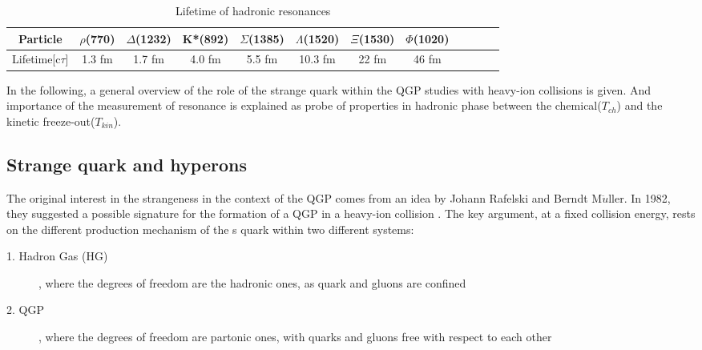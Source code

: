 \begin{table}[h!]
\begin{center}

\begin{tabular}{|c|c|c|c|c|c|c|clc|c|c|}
\hline
Particle & $\rho$(770) & $\Delta$(1232) &K*(892) & $\Sigma$(1385) &$\Lambda$(1520) & $\Xi$(1530)& $\Phi$(1020)\\
\hline
Lifetime[c$\tau$] &  1.3 fm &1.7 fm & 4.0 fm& 5.5 fm& 10.3 fm & 22 fm& 46 fm\\
\hline
\end{tabular}
\caption{Lifetime of hadronic resonances}\label{table:rsnptl}
\end{center}
\end{table}



In the following, a general overview of the role of the strange quark within the QGP studies with heavy-ion collisions is given.
And  importance of the measurement of resonance is explained as probe of properties in hadronic phase between the chemical($T_{ch}$) and the kinetic freeze-out($T_{kin}$). 



\subsection{Strange quark and hyperons}
  
The original interest in the strangeness in the context of the QGP comes from an idea by Johann Rafelski and Berndt M$\ddot{u}$ller. In 1982, they suggested a possible signature for the formation of a QGP in a heavy-ion collision \cite{cite:strangeness}. The key argument, at a fixed collision energy, rests on the different production mechanism of the s quark within two different systems:
\begin{description}
\item[1. Hadron Gas (HG)], where the degrees of freedom are the hadronic ones, as quark and gluons are confined
\item[2. QGP], where the degrees of freedom are partonic ones, with quarks and gluons free with respect to each other
\end{description}


